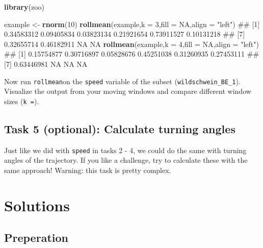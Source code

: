 \documentclass[]{book}
\newenvironment{Shaded}{\begin{snugshade}}{\end{snugshade}}
\newcommand{\KeywordTok}[1]{\textcolor[rgb]{0.13,0.29,0.53}{\textbf{#1}}}
\newcommand{\DataTypeTok}[1]{\textcolor[rgb]{0.13,0.29,0.53}{#1}}
\newcommand{\DecValTok}[1]{\textcolor[rgb]{0.00,0.00,0.81}{#1}}
\newcommand{\StringTok}[1]{\textcolor[rgb]{0.31,0.60,0.02}{#1}}
\newcommand{\OtherTok}[1]{\textcolor[rgb]{0.56,0.35,0.01}{#1}}
\newcommand{\NormalTok}[1]{#1}
\begin{document}
\begin{Shaded}
\begin{Highlighting}[]

\KeywordTok{library}\NormalTok{(zoo)}

\NormalTok{example <-}\StringTok{ }\KeywordTok{rnorm}\NormalTok{(}\DecValTok{10}\NormalTok{)}
\KeywordTok{rollmean}\NormalTok{(example,}\DataTypeTok{k =} \DecValTok{3}\NormalTok{,}\DataTypeTok{fill =} \OtherTok{NA}\NormalTok{,}\DataTypeTok{align =} \StringTok{"left"}\NormalTok{)}
\NormalTok{##  [1] 0.34583312 0.09405834 0.03823134 0.21921654 0.73911527 0.10131218}
\NormalTok{##  [7] 0.32655714 0.46182911         NA         NA}
\KeywordTok{rollmean}\NormalTok{(example,}\DataTypeTok{k =} \DecValTok{4}\NormalTok{,}\DataTypeTok{fill =} \OtherTok{NA}\NormalTok{,}\DataTypeTok{align =} \StringTok{"left"}\NormalTok{)}
\NormalTok{##  [1] 0.15754877 0.30716897 0.05828676 0.45251038 0.31260935 0.27453111}
\NormalTok{##  [7] 0.63446981         NA         NA         NA}
\end{Highlighting}
\end{Shaded}

Now run \texttt{rollmean}on the \texttt{speed} variable of the subset
(\texttt{wildschwein\_BE\_1}). Visualize the output from your moving
windows and compare different window sizes (\texttt{k\ =}).

\subsection{Task 5 (optional): Calculate turning
angles}\label{task-5-optional-calculate-turning-angles}

Just like we did with \texttt{speed} in tasks 2 - 4, we could do the
same with turning angles of the trajectory. If you like a challenge, try
to calculate these with the same approach! Warning: this task is pretty
complex.

\section{Solutions}\label{solutions}

\subsection{Preperation}\label{preperation-2}
\end{document}
